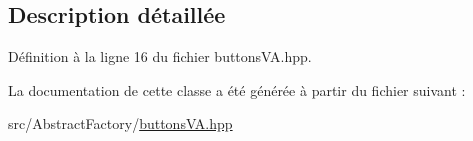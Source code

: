 \subsection{Description détaillée}


Définition à la ligne 16 du fichier buttons\+V\+A.\+hpp.



La documentation de cette classe a été générée à partir du fichier suivant \+:\begin{DoxyCompactItemize}
\item 
src/\+Abstract\+Factory/\hyperlink{buttonsVA_8hpp}{buttons\+V\+A.\+hpp}\end{DoxyCompactItemize}
